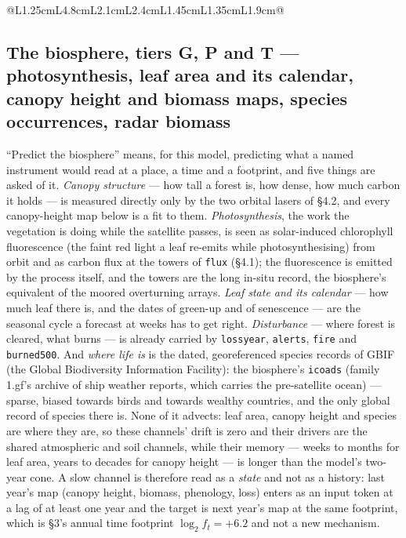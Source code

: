 \documentclass[10pt]{article}
\newcommand{\code}[1]{\texttt{#1}}
\begin{document}
{\begin{longtable}{@{}L{1.25cm}L{4.8cm}L{2.1cm}L{2.4cm}L{1.45cm}L{1.35cm}L{1.9cm}@{}}
\bottomrule
\caption{The two orbital LiDARs. GEDI's version 3 (2026-07-01) improved
geolocation to about 10\,m; the instrument's status after July 2025 is not
stated by the mission and is treated as ongoing. Phase A builds \emph{one
year} of each --- 2022, a year both instruments flew in full --- and the
probe's measured rows, bytes and fetch rate then decide how much of the rest
is built and where; the sizes in the table are for the whole record.}
\end{longtable}}

\subsection{The biosphere, tiers G, P and T --- photosynthesis, leaf area and its calendar, canopy height and biomass maps, species occurrences, radar biomass}

``Predict the biosphere'' means, for this model, predicting what a named
instrument would read at a place, a time and a footprint, and five things are
asked of it. \emph{Canopy structure} --- how tall a forest is, how dense, how
much carbon it holds --- is measured directly only by the two orbital lasers
of \S4.2, and every canopy-height map below is a fit to them.
\emph{Photosynthesis}, the work the vegetation is doing while the satellite
passes, is seen as solar-induced chlorophyll fluorescence (the faint red
light a leaf re-emits while photosynthesising) from orbit and as carbon flux
at the towers of \code{flux} (\S4.1); the fluorescence is emitted by the
process itself, and the towers are the long in-situ record, the biosphere's
equivalent of the moored overturning arrays. \emph{Leaf state and its
calendar} --- how much leaf there is, and the dates of green-up and of
senescence --- are the seasonal cycle a forecast at weeks has to get right.
\emph{Disturbance} --- where forest is cleared, what burns --- is already
carried by \code{lossyear}, \code{alerts}, \code{fire} and \code{burned500}.
And \emph{where life is} is the dated, georeferenced species records of GBIF
(the Global Biodiversity Information Facility): the biosphere's \code{icoads}
(family 1.gf's archive of ship weather reports, which carries the
pre-satellite ocean) --- sparse, biased towards birds and towards wealthy
countries, and the only global record of species there is. None of it
advects: leaf area, canopy height and species are where they are, so these
channels' drift is zero and their drivers are the shared atmospheric and soil
channels, while their memory --- weeks to months for leaf area, years to
decades for canopy height --- is longer than the model's two-year cone. A
slow channel is therefore read as a \emph{state} and not as a history: last
year's map (canopy height, biomass, phenology, loss) enters as an input token
at a lag of at least one year and the target is next year's map at the same
footprint, which is \S3's annual time footprint $\log_2 f_t = +6.2$ and not a
new mechanism.
\end{document}
